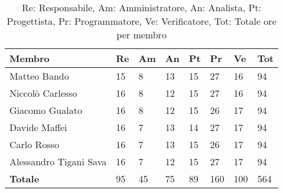 \begin{table}[H]
	\renewcommand{\arraystretch}{1.5}
	\centering
	\begin{tabular}{l|l|l|l|l|l|l|l}
		\textbf{Membro} & \textbf{Re} & \textbf{Am} & \textbf{An} & \textbf{Pt}
		& \textbf{Pr} & \textbf{Ve} & \textbf{Tot} \\
		\toprule
		 Matteo Bando &				15 & 8 & 13	& 15 & 27 & 16 & 94		\\
		 Niccolò Carlesso &			16 & 8 & 12	& 15 & 27 & 16 & 94		\\
		 Giacomo Gualato &			16 & 8 & 12 & 15 & 26 & 17 & 94		\\
		 Davide Maffei	&			16 & 7 & 13 & 14 & 27 & 17 & 94		\\
		 Carlo Rosso &				16 & 7 & 13 & 15 & 26 & 17 & 94		\\
		 Alessandro Tigani Sava &	16 & 7 & 12 & 15 & 27 & 17 & 94		\\
		 \bottomrule
		 \textbf{Totale} &			95 & 45 & 75 & 89 & 160 & 100 & 564 \\
	\end{tabular}

	\caption{Re: Responsabile, Am: Amministratore, An: Analista, Pt:
	Progettista, Pr: Programmatore, Ve: Verificatore, Tot: Totale ore per 
	membro}
\end{table}
